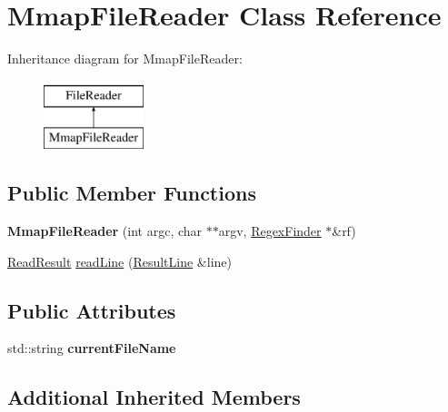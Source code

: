 \hypertarget{class_mmap_file_reader}{\section{Mmap\-File\-Reader Class Reference}
\label{class_mmap_file_reader}
}
Inheritance diagram for Mmap\-File\-Reader\-:\begin{figure}[H]
\begin{center}
\leavevmode
\includegraphics[height=2.000000cm]{class_mmap_file_reader}
\end{center}
\end{figure}
\subsection*{Public Member Functions}
\begin{DoxyCompactItemize}
\item 
\hypertarget{class_mmap_file_reader_aee7070c7d8242bf451a72de1cc6261ba}{{\bfseries Mmap\-File\-Reader} (int argc, char $\ast$$\ast$argv, \hyperlink{class_regex_finder}{Regex\-Finder} $\ast$\&rf)}\label{class_mmap_file_reader_aee7070c7d8242bf451a72de1cc6261ba}

\item 
\hyperlink{class_file_reader_a8e801198c62f657dd1dff8fd8dbe796f}{Read\-Result} \hyperlink{class_mmap_file_reader_acfc30ca58228b5ce38cf1db169aeadb0}{read\-Line} (\hyperlink{class_result_line}{Result\-Line} \&line)
\end{DoxyCompactItemize}
\subsection*{Public Attributes}
\begin{DoxyCompactItemize}
\item 
\hypertarget{class_mmap_file_reader_a4e59ccc0d490da5f3c0a741b87e89773}{std\-::string {\bfseries current\-File\-Name}}\label{class_mmap_file_reader_a4e59ccc0d490da5f3c0a741b87e89773}

\end{DoxyCompactItemize}
\subsection*{Additional Inherited Members}


